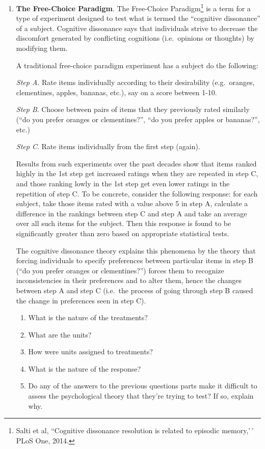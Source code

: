 \documentclass[
  letterpaper,
  DIV=11,
  numbers=noendperiod]{scrartcl}
\providecommand{\tightlist}{%
  \setlength{\itemsep}{0pt}\setlength{\parskip}{0pt}}
\begin{document}
\begin{enumerate}
\def\labelenumi{\arabic{enumi}.}
\setcounter{enumi}{1}
\item
  \textbf{The Free-Choice Paradigm}. The Free-Choice Paradigm\footnote{Salti
    et al, ``Cognitive dissonance resolution is related to episodic
    memory,'\,' PLoS One, 2014.} is a term for a type of experiment
  designed to test what is termed the ``cognitive dissonance'' of a
  subject. Cognitive dissonance says that individuals strive to decrease
  the discomfort generated by conflicting cognitions (i.e.~opinions or
  thoughts) by modifying them.

  A traditional free-choice paradigm experiment has a subject do the
  following:

  \emph{Step A}. Rate items individually according to their desirability
  (e.g.~oranges, clementines, apples, bananas, etc.), say on a score
  between 1-10.

  \emph{Step B}. Choose between pairs of items that they previously
  rated similarly (``do you prefer oranges or clementines?'', ``do you
  prefer apples or bananas?'', etc.)

  \emph{Step C}. Rate items individually from the first step (again).

  Results from such experiments over the past decades show that items
  ranked highly in the 1st step get increased ratings when they are
  repeated in step C, and those ranking lowly in the 1st step get even
  lower ratings in the repetition of step C. To be concrete, consider
  the following response: for each subject, take those items rated with
  a value above 5 in step A, calculate a difference in the rankings
  between step C and step A and take an average over all such items for
  the subject. Then this response is found to be significantly greater
  than zero based on appropriate statistical tests.

  The cognitive dissonance theory explains this phenomena by the theory
  that forcing individuals to specify preferences between particular
  items in step B (``do you prefer oranges or clementines?'') forces
  them to recognize inconsistencies in their preferences and to alter
  them, hence the changes between step A and step C (i.e.~the process of
  going through step B caused the change in preferences seen in step C).

  \begin{enumerate}
  \def\labelenumii{\alph{enumii}.}
  \tightlist
  \item
    What is the nature of the treatments?
  \item
    What are the units?
  \item
    How were units assigned to treatments?
  \item
    What is the nature of the response?
  \item
    Do any of the answers to the previous questions parts make it
    difficult to assess the psychological theory that they're trying to
    test? If so, explain why.
  \end{enumerate}


\end{enumerate}
\end{document}
